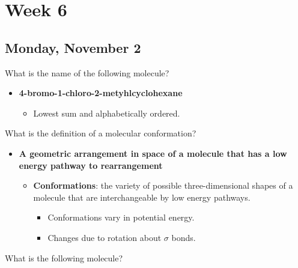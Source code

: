 \documentclass[12pt,a4paper]{article}
\begin{document}

\clearpage
\section*{Week 6}
{}

\subsection{Monday, November 2}
\begin{enumerate}
    {\color{G-Moon}\item What is the name of the following molecule?
    
    \vspace*{10pt}
    }
        \begin{itemize}
            \item {\color{o-Sun}\textbf{4-bromo-1-chloro-2-metyhlcyclohexane}}
            \begin{itemize}
                \item Lowest sum and alphabetically ordered.
            \end{itemize}
        \end{itemize}
    {\color{G-Moon}\item What is the definition of a molecular conformation?}
        \begin{itemize}
            \item {\color{o-Sun}\textbf{A geometric arrangement in space of a molecule that has a low energy pathway to rearrangement}}
            \begin{itemize}
                \item \textbf{Conformations}: the variety of possible three-dimensional shapes of a molecule that are interchangeable by low energy pathways.
                    \begin{itemize}
                        \item Conformations vary in potential energy.
                        \item Changes due to rotation about $\sigma$ bonds.
                    \end{itemize}
            \end{itemize}
        \end{itemize}
    {\color{G-Moon}\item What is the following molecule?
    
}
\end{enumerate}
\end{document}
